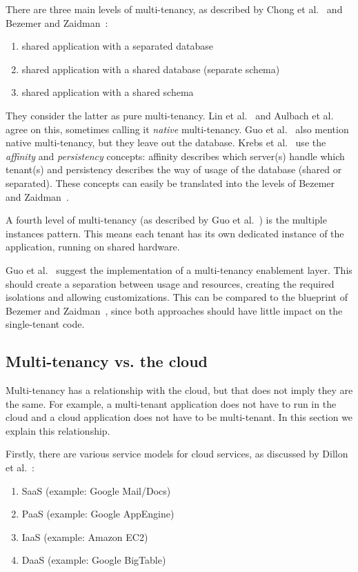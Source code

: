 There are three main levels of multi-tenancy, as described by Chong et al.~\cite{chong2006multi} and Bezemer and Zaidman~\cite{bezemer2010multi}:
\begin{enumerate}
\item shared application with a separated database
\item shared application with a shared database (separate schema)
\item shared application with a shared schema
\end{enumerate}
They consider the latter as pure multi-tenancy. Lin et al.~\cite{lin2009feedback} and Aulbach et al.~\cite{aulbach2009comparison} agree on this, sometimes calling it \emph{native} multi-tenancy. Guo et al.~\cite{guo2007framework} also mention native multi-tenancy, but they leave out the database. Krebs et al.~\cite{krebs2012architecture} use the \emph{affinity} and \emph{persistency} concepts: affinity describes which server(s) handle which tenant(s) and persistency describes the way of usage of the database (shared or separated). These concepts can easily be translated into the levels of Bezemer and Zaidman~\cite{bezemer2010multi}. 

A fourth level of multi-tenancy (as described by Guo et al.~\cite{guo2007framework}) is the multiple instances pattern. This means each tenant has its own dedicated instance of the application, running on shared hardware.

Guo et al.~\cite{guo2007framework} suggest the implementation of a multi-tenancy enablement layer. This should create a separation between usage and resources, creating the required isolations and allowing customizations. This can be compared to the blueprint of Bezemer and Zaidman~\cite{bezemer2010multi}, since both approaches should have little impact on the single-tenant code.

\subsection{Multi-tenancy vs. the cloud}

Multi-tenancy has a relationship with the cloud, but that does not imply they are the same. For example, a multi-tenant application does not have to run in the cloud and a cloud application does not have to be multi-tenant. In this section we explain this relationship.

Firstly, there are various service models for cloud services, as discussed by Dillon et al.~\cite{dillon2010cloud}:
\begin{enumerate}
\item \acf{SaaS} (example: Google Mail/Docs)
\item \acf{PaaS} (example: Google AppEngine)
\item \acf{IaaS} (example: Amazon EC2)
\item \acf{DaaS} (example: Google BigTable)
\end{enumerate}

